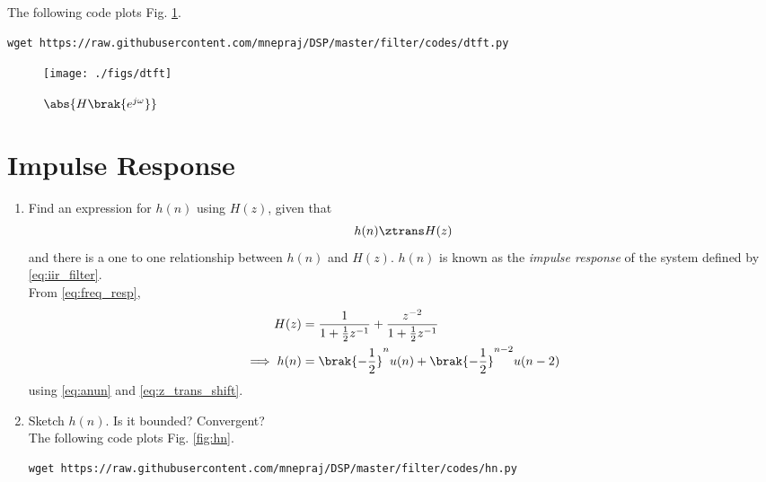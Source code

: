 \documentclass[journal, 12pt, twocolumn]{IEEEtran}
\renewcommand\thesection{\arabic{section}}
\begin{document}
\begin{enumerate}[label=\thesection.\arabic*]
	      The following code plots Fig. \ref{fig:dtft}.
	      \begin{lstlisting}
wget https://raw.githubusercontent.com/mnepraj/DSP/master/filter/codes/dtft.py
\end{lstlisting}
	      \begin{figure}[!ht]
		      \centering
		      \texttt{[image: ./figs/dtft]}
		      \caption{$\abs{H\brak{e^{j\omega}}}$}
		      \label{fig:dtft}
	      \end{figure}
\end{enumerate}

\section{Impulse Response}
\begin{enumerate}[label=\thesection.\arabic*]
	\item \label{prob:impulse_resp}
	      Find an expression for $h(n)$ using $H(z)$, given that
	      \begin{equation}
		      \label{eq:impulse_resp}
		      h(n) \ztrans H(z)
	      \end{equation}
	      and there is a one to one relationship between $h(n)$ and $H(z)$. $h(n)$ is known as the {\em impulse response} of the
	      system defined by \eqref{eq:iir_filter}.
	      \\
	      \solution From \eqref{eq:freq_resp},
	      \begin{align}
		      H(z)          & = \frac{1}{1 + \frac{1}{2}z^{-1}} + \frac{ z^{-2}}{1 + \frac{1}{2}z^{-1}}
		      \\
		      \implies h(n) & = \brak{-\frac{1}{2}}^{n}u(n) + \brak{-\frac{1}{2}}^{n-2}u(n-2)
	      \end{align}
	      using \eqref{eq:anun} and \eqref{eq:z_trans_shift}.
	\item Sketch $h(n)$. Is it bounded? Convergent?
	      \\
	      \solution The following code plots Fig. \ref{fig:hn}.
	      \begin{lstlisting}
wget https://raw.githubusercontent.com/mnepraj/DSP/master/filter/codes/hn.py
\end{lstlisting}
	      \begin{figure}[!ht]
		      \centering

\end{figure}
\end{enumerate}
\end{document}
